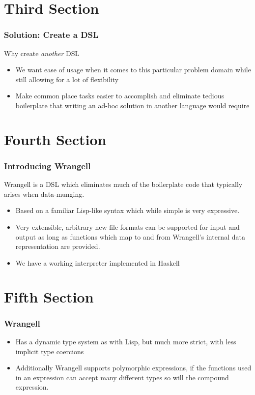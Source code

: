 \documentclass{beamer}
\begin{document}
\section{Third Section}
\begin{frame}
\frametitle{Solution: Create a DSL}
Why create \textit{another} DSL 
\begin{itemize}
    \item<1-> We want ease of usage when it comes to this particular problem domain while still allowing for a lot of flexibility 
    \item<1-> Make common place tasks easier to accomplish and eliminate tedious boilerplate that writing an ad-hoc solution in another language would require 
\end{itemize}
\end{frame}

\section{Fourth Section}
\begin{frame}
\frametitle{Introducing Wrangell}
Wrangell is a DSL which eliminates much of the boilerplate code that typically arises when data-munging.
\begin{itemize}
    \item<1> Based on a familiar Lisp-like syntax which while simple is very expressive.
    \item<1> Very extensible, arbitrary new file formats can be supported for input and output as long as functions which map to and from Wrangell's internal data representation are provided.
    \item<1>We have a working interpreter implemented in Haskell
\end{itemize}
\end{frame}


\section{Fifth Section}
\begin{frame}
\frametitle{Wrangell}
\begin{itemize}
    \item<1> Has a dynamic type system as with Lisp, but much more strict, with less implicit type coercions 
    \item<1> Additionally Wrangell supports polymorphic expressions, if the functions used in an expression can accept many different types so will the compound expression.
\end{itemize}
\end{frame}
\end{document}
